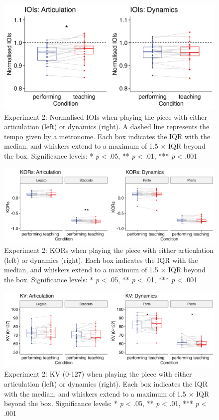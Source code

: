 \documentclass[
  man,floatsintext]{apa6}
\begin{document}
\begin{figure}
\includegraphics[width=1\linewidth]{manuscript_files/figure-latex/plot-ioi-2-1} \caption{\label{fig:ioi-2}Experiment 2: Normalised IOIs when playing the piece with either articulation (left) or dynamics (right). A dashed line represents the tempo given by a metronome. Each box indicates the IQR with the median, and whiskers extend to a maximum of 1.5 × IQR beyond the box. Significance levels: * \textit{p} < .05, ** \textit{p} < .01, *** \textit{p} < .001}\label{fig:plot-ioi-2}
\end{figure}

\begin{figure}
\includegraphics[width=1\linewidth]{manuscript_files/figure-latex/plot-kor-2-1} \caption{\label{fig:kor-2}Experiment 2: KORs when playing the piece with either articulation (left) or dynamics (right). Each box indicates the IQR with the median, and whiskers extend to a maximum of 1.5 × IQR beyond the box. Significance levels: * \textit{p} < .05, ** \textit{p} < .01, *** \textit{p} < .001}\label{fig:plot-kor-2}
\end{figure}

\begin{figure}
\includegraphics[width=1\linewidth]{manuscript_files/figure-latex/plot-vel-2-1} \caption{\label{fig:vel-2}Experiment 2: KV (0-127) when playing the piece with either articulation (left) or dynamics (right). Each box indicates the IQR with the median, and whiskers extend to a maximum of 1.5 × IQR beyond the box. Significance levels: * \textit{p} < .05, ** \textit{p} < .01, *** \textit{p} < .001}\label{fig:plot-vel-2}
\end{figure}
\end{document}
